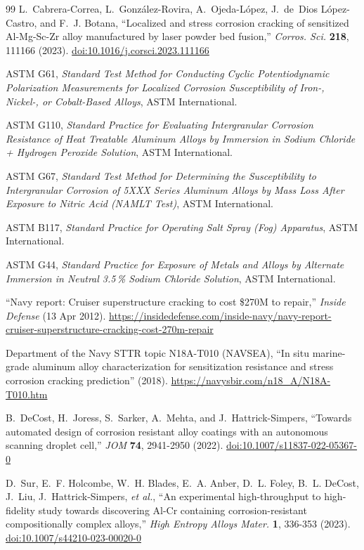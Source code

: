 \documentclass[12pt,letterpaper]{article}
\begin{document}
\begin{thebibliography}{99}
L.~Cabrera-Correa, L.~Gonz{\'a}lez-Rovira, A.~Ojeda-L{\'o}pez, J.~de~Dios
L{\'o}pez-Castro, and F.~J. Botana, ``Localized and stress corrosion
cracking of sensitized Al-Mg-Sc-Zr alloy manufactured by laser powder bed
fusion,'' \emph{Corros. Sci.} \textbf{218}, 111166 (2023).
\href{https://doi.org/10.1016/j.corsci.2023.111166}{doi:10.1016/j.corsci.2023.111166}

ASTM G61, \emph{Standard Test Method for Conducting Cyclic Potentiodynamic
Polarization Measurements for Localized Corrosion Susceptibility of Iron-,
Nickel-, or Cobalt-Based Alloys}, ASTM International.

ASTM G110, \emph{Standard Practice for Evaluating Intergranular Corrosion
Resistance of Heat Treatable Aluminum Alloys by Immersion in Sodium Chloride
+ Hydrogen Peroxide Solution}, ASTM International.

ASTM G67, \emph{Standard Test Method for Determining the Susceptibility to
Intergranular Corrosion of 5XXX Series Aluminum Alloys by Mass Loss After
Exposure to Nitric Acid (NAMLT Test)}, ASTM International.

ASTM B117, \emph{Standard Practice for Operating Salt Spray (Fog) Apparatus},
ASTM International.

ASTM G44, \emph{Standard Practice for Exposure of Metals and Alloys by
Alternate Immersion in Neutral 3.5\,\% Sodium Chloride Solution}, ASTM
International.

``Navy report: Cruiser superstructure cracking to cost \$270M to repair,''
\emph{Inside Defense} (13 Apr 2012).
\url{https://insidedefense.com/inside-navy/navy-report-cruiser-superstructure-cracking-cost-270m-repair}

Department of the Navy STTR topic N18A-T010 (NAVSEA), ``In situ marine-grade
aluminum alloy characterization for sensitization resistance and stress
corrosion cracking prediction'' (2018).
\url{https://navysbir.com/n18_A/N18A-T010.htm}

B.~DeCost, H.~Joress, S.~Sarker, A.~Mehta, and J.~Hattrick-Simpers,
``Towards automated design of corrosion resistant alloy coatings with an
autonomous scanning droplet cell,'' \emph{JOM} \textbf{74}, 2941-2950 (2022).
\href{https://doi.org/10.1007/s11837-022-05367-0}{doi:10.1007/s11837-022-05367-0}

D.~Sur, E.~F. Holcombe, W.~H. Blades, E.~A. Anber, D.~L. Foley, B.~L. DeCost,
J.~Liu, J.~Hattrick-Simpers, \emph{et al.}, ``An experimental high-throughput
to high-fidelity study towards discovering Al-Cr containing
corrosion-resistant compositionally complex alloys,'' \emph{High Entropy
Alloys Mater.} \textbf{1}, 336-353 (2023).
\href{https://doi.org/10.1007/s44210-023-00020-0}{doi:10.1007/s44210-023-00020-0}


\end{thebibliography}
\end{document}
